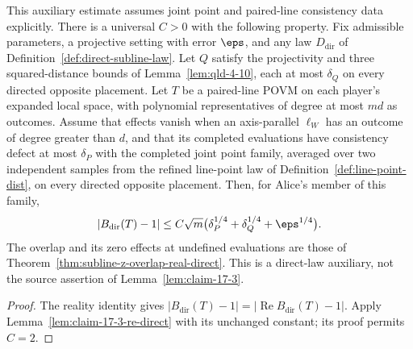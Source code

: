 \begin{theorem}
	\label{thm:claim-17-3-direct}
	\leanok
	This auxiliary estimate assumes joint point and paired-line consistency
	data explicitly. There is a universal $C>0$ with the following property.
	Fix admissible parameters, a projective setting with error $\eps$, and
	any law $D_{\mathrm{dir}}$ of Definition~\ref{def:direct-subline-law}.
	Let $Q$ satisfy the projectivity and three squared-distance bounds of
	Lemma~\ref{lem:qld-4-10}, each at most $\delta_Q$ on every directed
	opposite placement. Let $T$ be a paired-line POVM on each player's
	expanded local space, with polynomial representatives of degree at most
	$md$ as outcomes. Assume that effects vanish when an axis-parallel
	$\ell_W$ has an outcome of degree greater than $d$, and that its completed
	evaluations have consistency defect at most $\delta_P$ with the completed joint point
	family, averaged over two independent samples from the refined line-point
	law of Definition~\ref{def:line-point-dist}, on every directed opposite
	placement. Then, for Alice's member of this family,
	\[
		|B_{\mathrm{dir}}(T)-1|\le
		C\sqrt m\bigl(\delta_P^{1/4}+\delta_Q^{1/4}+\eps^{1/4}\bigr).
	\]
	The overlap and its zero effects at undefined evaluations are those of
	Theorem~\ref{thm:subline-z-overlap-real-direct}. This is a direct-law
	auxiliary, not the source assertion of Lemma~\ref{lem:claim-17-3}.
\end{theorem}
\begin{proof}
	\leanok
	The reality identity gives
	$|B_{\mathrm{dir}}(T)-1|=|\operatorname{Re}B_{\mathrm{dir}}(T)-1|$.
	Apply Lemma~\ref{lem:claim-17-3-re-direct} with its unchanged constant;
	its proof permits $C=2$.
\end{proof}

